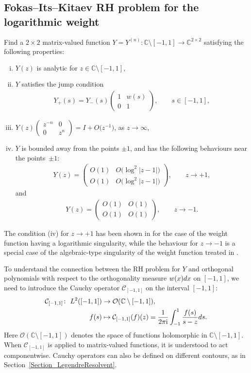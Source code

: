 \documentclass[11pt]{article}
\numberwithin{equation}{section}
\newcommand{\C}{\mathbb{C}}
\newcommand{\Id}{I}
\newcommand{\I}{\mathrm{i}}
\numberwithin{equation}{section}
\begin{document}
\subsection{Fokas--Its--Kitaev RH problem for the logarithmic weight}
Find a $2\times2$ matrix-valued function $Y = Y^{(n)} \colon \C \setminus [-1,1] \to \C^{2\times2}$ satisfying the following properties:
\begin{enumerate}[(i)]\itemsep=0pt
 \item $Y(z)$ is analytic for $z \in \C \setminus [-1,1]$,
 \item $Y$ satisfies the jump condition
 \begin{align*}
 Y_+(s) = Y_-(s) \begin{pmatrix}
 1 & w(s)
 \\
 0 & 1
 \end{pmatrix}, \qquad s\in [-1,1],
 \end{align*}
\item $Y(z)\begin{pmatrix}
z^{-n} & 0
\\
0 & z^n
\end{pmatrix} = \Id + O\big(z^{-1}\big)$, as $z \rightarrow \infty$,
\item $Y$ is bounded away from the points $\pm 1$, and has the following behaviours near the points~$\pm1$:
\begin{align*}
 Y(z) = \begin{pmatrix}
 O(1) & O\big(\log^2|z-1|\big)
 \\
 O(1) & O\big(\log^2|z-1|\big)
 \end{pmatrix}, \qquad z\to +1,
\end{align*}
and
\begin{align*}
 Y(z) = \begin{pmatrix}
 O(1) & O(1)
 \\
 O(1) & O(1)
 \end{pmatrix}, \qquad z \to -1.
\end{align*}
\end{enumerate}
The condition (iv) for $z \to +1$ has been shown in \cite[Section~3.1]{CD} for the case of the weight function having a logarithmic singularity, while the behaviour for $z \to -1$ is a special case of the algebraic-type singularity of the weight function treated in \cite[Section~2]{KMVV}.

To understand the connection between the RH problem for $Y$ and orthogonal polynomials with respect to the orthogonality measure $w(x){\rm d}x$ on $[-1,1]$, we need to introduce the Cauchy operator $\mathcal C_{[-1,1]}$ on the interval $[-1,1]$:
\begin{align*}
 \mathcal C_{[-1,1]}\colon\ L^2([-1,1])&\to \mathcal O(\C \setminus [-1,1]),
 \\
 f(s) &\mapsto \mathcal C_{[-1,1]}(f)(z) = \frac{1}{2\pi\I} \int_{-1}^1 \frac{f(s)}{s-z} {\rm d}s.
\end{align*}
Here $\mathcal O(\C \setminus [-1,1])$ denotes the space of functions holomorphic in $\C \setminus [-1,1]$. When $\mathcal C_{[-1,1]}$ is applied to matrix-valued functions, it is understood to act componentwise. Cauchy operators can also be defined on different contours, as in Section~\ref{Section_LegendreResolvent}.
\end{document}

